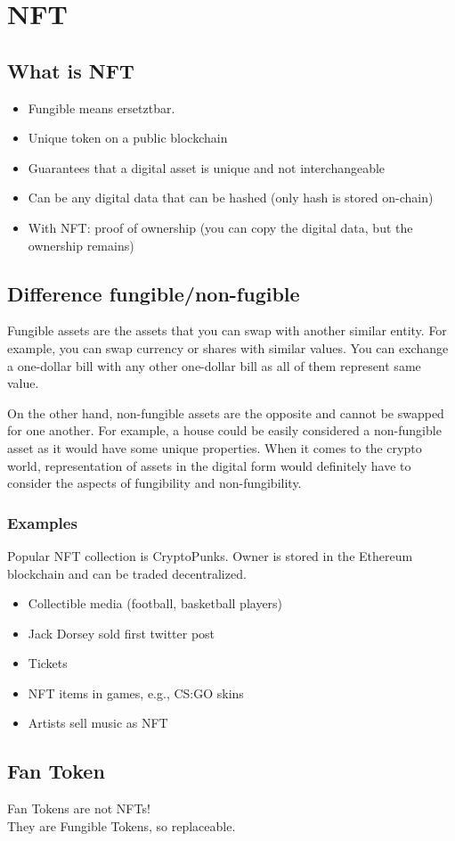 \section{NFT}
\subsection{What is NFT}
\begin{itemize}
  \item Fungible means ersetztbar.
  \item Unique token on a public blockchain
  \item Guarantees that a digital asset is unique and not interchangeable
  \item Can be any digital data that can be hashed (only hash is stored on-chain)
  \item With NFT: proof of ownership (you can copy the digital data, but the ownership remains)
\end{itemize}

\subsection{Difference fungible/non-fugible}
Fungible assets are the assets that you can swap with another similar entity. 
For example, you can swap currency or shares with similar values. 
You can exchange a one-dollar bill with any other one-dollar bill as all of them represent same value.

On the other hand, non-fungible assets are the opposite and cannot be swapped for one another.
For example, a house could be easily considered a non-fungible asset as it would have some unique properties.
When it comes to the crypto world, representation of assets in the digital form would definitely have to consider the aspects of fungibility and non-fungibility.

\subsubsection{Examples}
Popular NFT collection is CryptoPunks.
Owner is stored in the Ethereum blockchain and can be traded decentralized.

\begin{itemize}
  \item Collectible media (football, basketball players)
  \item Jack Dorsey sold first twitter post
  \item Tickets
  \item NFT items in games, e.g., CS:GO skins
  \item Artists sell music as NFT
\end{itemize}

\subsection{Fan Token}
Fan Tokens are not NFTs!\\
They are Fungible Tokens, so replaceable.

